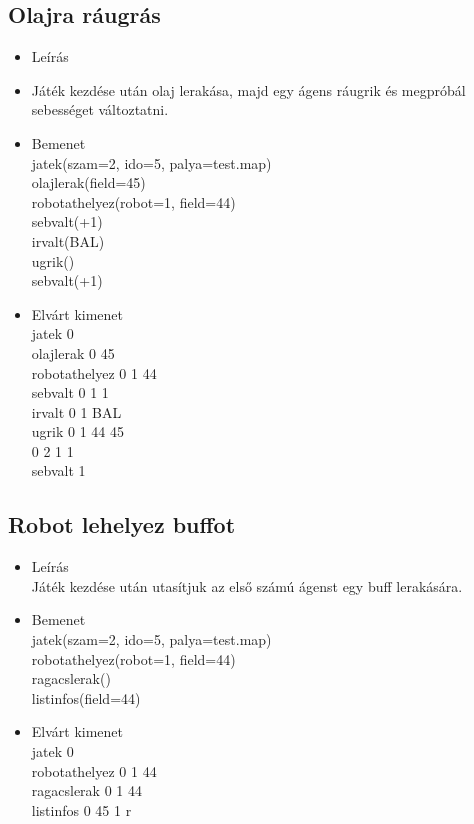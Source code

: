 \subsection{Olajra ráugrás}
\begin{itemize}
	\item Leírás\\
	\item Játék kezdése után olaj lerakása, majd egy ágens ráugrik és megpróbál sebességet változtatni. 
	\item Bemenet\\	
		jatek(szam=2, ido=5, palya=test.map) \\
		olajlerak(field=45) \\
		robotathelyez(robot=1, field=44) \\
		sebvalt(+1) \\
		irvalt(BAL) \\
		ugrik() \\
		sebvalt(+1)	\\
	\item Elvárt kimenet\\
		jatek 0 \\
		olajlerak 0 45 \\
		robotathelyez 0 1 44 \\
		sebvalt 0 1 1 \\
		irvalt 0 1 BAL \\
		ugrik 0 1 44 45 \\
		      0 2 1 1 \\
		sebvalt 1 \\
\end{itemize}

\subsection{Robot lehelyez buffot}
\begin{itemize}
	\item Leírás\\
	Játék kezdése után utasítjuk az első számú ágenst egy buff lerakására.
	\item Bemenet\\	
		jatek(szam=2, ido=5, palya=test.map) \\
		robotathelyez(robot=1, field=44) \\
		ragacslerak() \\
		listinfos(field=44) \\
	\item Elvárt kimenet\\
		jatek 0 \\
		robotathelyez 0 1 44 \\
		ragacslerak 0 1 44 \\
		listinfos 0 45 1 r\\		
\end{itemize}

